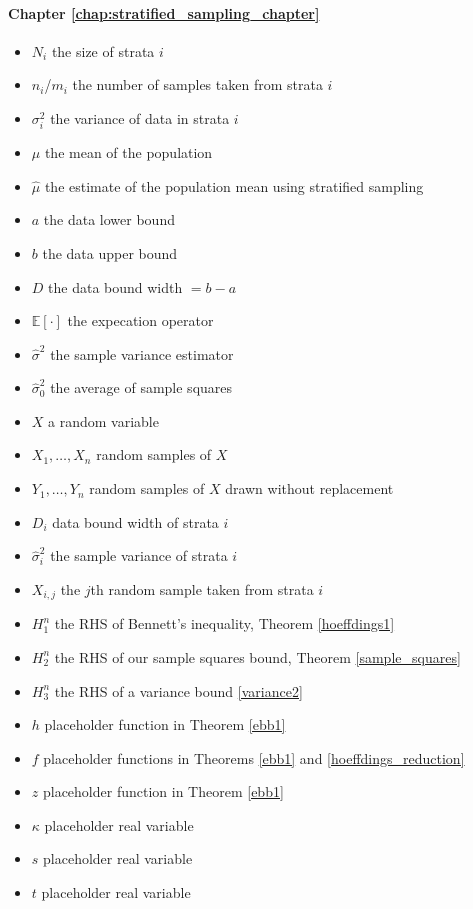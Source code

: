 \paragraph{Chapter \ref{chap:stratified_sampling_chapter}}
\begin{itemize}
\item	$N_i$ the size of strata $i$
\item	$n_i$/$m_i$ the number of samples taken from strata $i$
\item	$\sigma_i^2$ the variance of data in strata $i$
\item	$\mu$ the mean of the population
\item	$\hat{\mu}$ the estimate of the population mean using stratified sampling
\item	$a$ the data lower bound
\item	$b$ the data upper bound
\item	$D$ the data bound width $=b-a$
\item	$\mathbb{E}[\cdot]$ the expecation operator
\item	$\hat{\sigma}^2$ the sample variance estimator
\item	$\hat{\sigma}_0^2$ the average of sample squares
\item	$X$ a random variable
\item	$X_1,\dots,X_n$ random samples of $X$
\item	$Y_1,\dots,Y_n$ random samples of $X$ drawn without replacement
\item	$D_i$ data bound width of strata $i$
\item	$\hat{\sigma}^2_i$ the sample variance of strata $i$
\item	$X_{i,j}$ the $j$th random sample taken from strata $i$
\item	$H_1^n$ the RHS of Bennett's inequality, Theorem \ref{hoeffdings1}
\item	$H_2^n$ the RHS of our sample squares bound, Theorem \ref{sample_squares}
\item	$H_3^n$ the RHS of a variance bound \ref{variance2}
\item	$h$ placeholder function in Theorem \ref{ebb1}
\item	$f$ placeholder functions in Theorems \ref{ebb1} and \ref{hoeffdings_reduction}
\item	$z$ placeholder function in Theorem \ref{ebb1}
\item	$\kappa$ placeholder real variable
\item	$s$ placeholder real variable
\item	$t$ placeholder real variable

\end{itemize}
